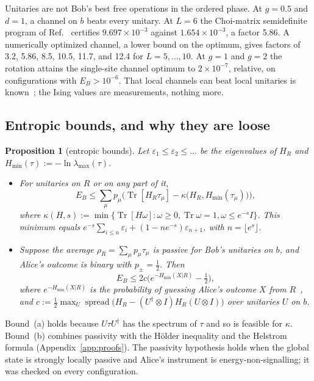 \documentclass[aps,pra,twocolumn,reprint,superscriptaddress,nofootinbib,floatfix]{revtex4-2}
\theoremstyle{plain}
\newtheorem{proposition}{Proposition}
\theoremstyle{remark}
\newcommand{\Tr}{\operatorname{Tr}}
\newcommand{\Hmin}{H_{\min}}
\newcommand{\spread}{\operatorname{spread}}
\begin{document}
Unitaries are not Bob's best free operations in the ordered phase. At $g=0.5$ and $d=1$, a
channel on $b$ beats every unitary. At $L=6$ the Choi-matrix semidefinite program of
Ref.~\cite{Alhambra2019} certifies $9.697\times10^{-3}$ against $1.654\times10^{-3}$, a factor
5.86. A numerically optimized channel, a lower bound on the optimum, gives factors of 3.2,
5.86, 8.5, 10.5, 11.7, and 12.4 for $L=5,\dots,10$. At $g=1$ and $g=2$ the rotation attains
the single-site channel optimum to $2\times10^{-7}$, relative, on configurations with
$E_B>10^{-6}$. That local channels can beat local unitaries is known~\cite{Alhambra2019,Salvia2023};
the Ising values are measurements, nothing more.

\subsection{Entropic bounds, and why they are loose}

\begin{proposition}[entropic bounds]
\label{prop:entropic}
Let $\varepsilon_1\le\varepsilon_2\le\dots$ be the eigenvalues of $H_R$ and
$\Hmin(\tau):=-\ln\lambda_{\max}(\tau)$.
\begin{itemize}
\item[(a)] For unitaries on $R$ or on any part of it,
\begin{equation}
E_B\le\sum_\mu p_\mu\Big(\Tr[H_R\tau_\mu]-\kappa\big(H_R,\Hmin(\tau_\mu)\big)\Big),
\label{eq:kyfan}
\end{equation}
where $\kappa(H,s):=\min\{\Tr[H\omega]:\omega\ge0,\Tr\omega=1,\omega\le e^{-s}I\}$. This
minimum equals $e^{-s}\sum_{i\le n}\varepsilon_i+(1-ne^{-s})\varepsilon_{n+1}$, with
$n=\lfloor e^{s}\rfloor$.
\item[(b)] Suppose the average $\rho_R=\sum_\mu p_\mu\tau_\mu$ is passive for Bob's unitaries on
$b$, and Alice's outcome is binary with $p_\pm=\tfrac12$. Then
\begin{equation}
E_B\le2c\Big(e^{-\Hmin(X|R)}-\tfrac12\Big),
\label{eq:guess}
\end{equation}
where $e^{-\Hmin(X|R)}$ is the probability of guessing Alice's outcome $X$ from
$R$~\cite{KRS2009}, and $c:=\tfrac12\max_U\spread\big(H_R-(U^\dagger\otimes
I)H_R(U\otimes I)\big)$ over unitaries $U$ on $b$.
\end{itemize}
\end{proposition}

Bound~(a) holds because $U\tau U^\dagger$ has the spectrum of $\tau$ and so is feasible for
$\kappa$. Bound~(b) combines passivity with the H\"older inequality and the Helstrom formula
(Appendix~\ref{app:proofs}). The passivity hypothesis holds when the global state is strongly
locally passive and Alice's instrument is energy-non-signalling; it was checked on every
configuration.
\end{document}

